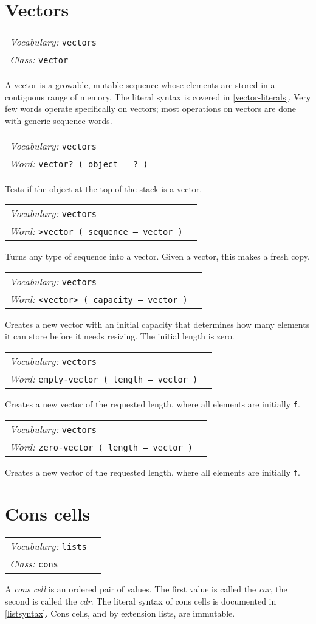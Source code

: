 \documentclass{book}
\newcommand{\vocabulary}[1]{\emph{Vocabulary:} \texttt{#1}&\\}
\newcommand{\ordinaryword}[2]{\index{\texttt{#1}}\emph{Word:} \texttt{#2}&\\}
\newcommand{\classword}[1]{\index{\texttt{#1}}\emph{Class:} \texttt{#1}&\\}
\newcommand{\wordtable}[1]{


\begin{tabularx}{12cm}{lX}
\hline
#1
\hline
\end{tabularx}

}
\begin{document}

\section{Vectors}\label{vectors}

\wordtable{
\vocabulary{vectors}
\classword{vector}
}
\vectorglos
A vector is a growable, mutable sequence whose elements are stored in a contiguous range of memory. The literal syntax is covered in \ref{vector-literals}. Very few words operate specifically on vectors; most operations on vectors are done with generic sequence words.

\wordtable{
\vocabulary{vectors}
\ordinaryword{vector?}{vector?~( object -- ?~)}

}
Tests if the object at the top of the stack is a vector.
\wordtable{
\vocabulary{vectors}
\ordinaryword{>vector}{>vector~( sequence -- vector )}
}
Turns any type of sequence into a vector. Given a vector, this makes a fresh copy.
\wordtable{
\vocabulary{vectors}
\ordinaryword{<vector>}{<vector>~( capacity -- vector )}
}
Creates a new vector with an initial capacity that determines how many elements it can store before it needs resizing. The initial length is zero.
\wordtable{
\vocabulary{vectors}
\ordinaryword{empty-vector}{empty-vector~( length -- vector )}
}
Creates a new vector of the requested length, where all elements are initially \texttt{f}.
\wordtable{
\vocabulary{vectors}
\ordinaryword{zero-vector}{zero-vector~( length -- vector )}
}
Creates a new vector of the requested length, where all elements are initially \texttt{f}.

\section{Cons cells}\label{cons-cells}

\consglos
{}

\wordtable{
\vocabulary{lists}
\classword{cons}
}
A \emph{cons cell} is an ordered pair of values. The first value is called the \emph{car},
the second is called the \emph{cdr}. The literal syntax of cons cells is documented in \ref{listsyntax}.
Cons cells, and by extension lists, are immutable.
\end{document}
